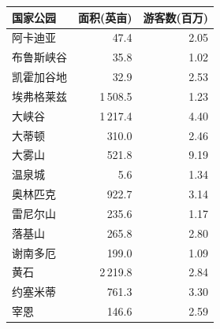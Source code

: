 \begin{mvtable}
\label{tab:1.11}
\begin{tabular}{lrr}
\toprule
国家公园 & 面积(英亩) & 游客数(百万) \\
\midrule
阿卡迪亚 & 47.4 & 2.05 \\
布鲁斯峡谷 & 35.8 & 1.02 \\
凯霍加谷地 & 32.9 & 2.53 \\
埃弗格莱兹 & 1\,508.5 & 1.23 \\
大峡谷 & 1\,217.4 & 4.40 \\
大蒂顿 & 310.0 & 2.46 \\
大雾山 & 521.8 & 9.19 \\
温泉城 & 5.6 & 1.34 \\
奥林匹克 & 922.7 & 3.14 \\
雷尼尔山 & 235.6 & 1.17 \\
落基山 & 265.8 & 2.80 \\
谢南多厄 & 199.0 & 1.09 \\
黄石 & 2\,219.8 & 2.84 \\
约塞米蒂 & 761.3 & 3.30 \\
宰恩 & 146.6 & 2.59 \\
\bottomrule
\end{tabular}
\end{mvtable}
